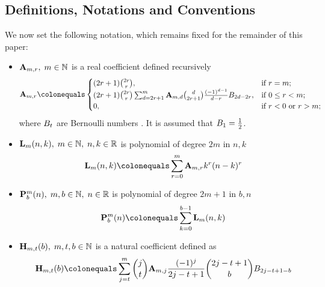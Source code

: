 \documentclass[12pt,letterpaper,oneside,reqno]{amsart}
\newcommand \bernoulli [2][B] {{#1}\sb{#2}}
\newcommand \coeffA [3][A] {{\mathbf{#1}} \sb{#2,#3}}
\newcommand \coeffH [4][H] {{\mathbf{#1}} \sb{#2,#3} (#4)}
\newcommand \polynomialP [4][P]{{\mathbf{#1}}\sp{#2} \sb{#3}(#4)}
\newcommand \polynomialL [4][L]{{\mathbf{#1}}\sb{#2}(#3,#4)}
\numberwithin{equation}{section}
\begin{document}
    \subsection{Definitions, Notations and Conventions}
    We now set the following notation, which remains fixed for the remainder of this paper:
    \begin{itemize}
        \item $\coeffA{m}{r}, \; m\in\mathbb{N}$ is a real coefficient defined recursively
        \begin{equation}
            \label{def_coeff_a}
            \coeffA{m}{r} \colonequals
            \begin{cases}
                (2r+1) \binom{2r}{r}, & \text{if } r=m; \\
                (2r+1) \binom{2r}{r} \sum_{d=2r+1}^{m} \coeffA{m}{d} \binom{d}{2r+1} \frac{(-1)^{d-1}}{d-r}
                \bernoulli{2d-2r}, & \text{if } 0 \leq r<m; \\
                0, & \text{if } r<0 \text{ or } r>m;
            \end{cases}
        \end{equation}
        where $\bernoulli{t}$ are Bernoulli numbers \cite{WeissteinBernoulli}.
        It is assumed that $\bernoulli{1}=\frac{1}{2}$.
        \item $\polynomialL{m}{n}{k}, \; m\in\mathbb{N}, \; n,k\in\mathbb{R}$ is polynomial of degree $2m$ in $n,k$
        \begin{equation*}
            \label{def_polynomial_l}
            \polynomialL{m}{n}{k} \colonequals \sum_{r=0}^{m} \coeffA{m}{r} k^r(n-k)^r
        \end{equation*}
        \item $\polynomialP{m}{b}{n}, \; m,b\in\mathbb{N}, \; n\in\mathbb{R}$ is polynomial of degree $2m+1$ in $b, n$
        \begin{equation*}
            \label{def_polynomial_p}
            \polynomialP{m}{b}{n} \colonequals \sum_{k=0}^{b-1} \polynomialL{m}{n}{k}
        \end{equation*}
        \item $\coeffH{m}{t}{b}, \; m,t,b\in\mathbb{N}$ is a natural coefficient defined as
        \begin{equation*}
            \label{def_coeff_h}
            \coeffH{m}{t}{b}
            \colonequals
            \sum_{j=t}^{m} \binom{j}{t} \coeffA{m}{j} \frac{(-1)^j}{2j-t+1} \binom{2j-t+1}{b} \bernoulli{2j-t+1-b}
        \end{equation*}

\end{itemize}
\end{document}
